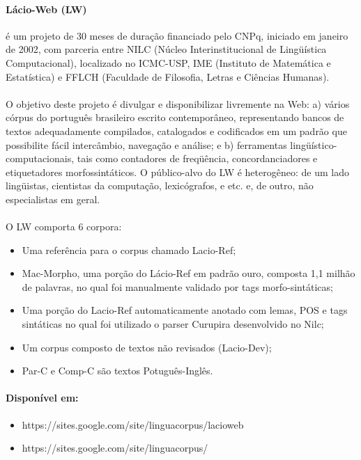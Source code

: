 \documentclass[a4paper, 10pt]{article}
\begin{document}
            	\paragraph{Lácio-Web (LW)} é um projeto de 30 meses de duração financiado pelo CNPq, iniciado em janeiro de 2002, com parceria entre NILC (Núcleo Interinstitucional de Lingüística Computacional), localizado no ICMC-USP, IME (Instituto de Matemática e Estatística) e FFLCH (Faculdade de Filosofia, Letras e Ciências Humanas).
                \paragraph{}O objetivo deste projeto é divulgar e disponibilizar livremente na Web: a) vários córpus do português brasileiro escrito contemporâneo, representando bancos de textos adequadamente compilados, catalogados e codificados em um padrão que possibilite fácil intercâmbio, navegação e análise; e b) ferramentas lingüístico-computacionais, tais como contadores de freqüência, concordanciadores e etiquetadores morfossintáticos. O público-alvo do LW é heterogêneo: de um lado lingüistas, cientistas da computação, lexicógrafos, e etc. e, de outro, não especialistas em geral.
                \paragraph{}O LW comporta 6 corpora:
                \begin{itemize}
                	\item Uma referência para o corpus chamado Lacio-Ref;
                    \item Mac-Morpho, uma porção do Lácio-Ref em padrão ouro, composta 1,1 milhão de palavras, no qual foi manualmente validado por tags morfo-sintáticas;
                    \item Uma porção do Lacio-Ref automaticamente anotado com lemas, POS e tags sintáticas no qual foi utilizado o parser Curupira desenvolvido no Nilc; 
                    \item Um corpus composto de textos não revisados (Lacio-Dev);
                    \item Par-C e Comp-C são textos Potuguês-Inglês.
                \end{itemize}
                \paragraph{Disponível em:}
            	\begin{itemize}
				    \item https://sites.google.com/site/linguacorpus/lacioweb
                    \item https://sites.google.com/site/linguacorpus/
			    \end{itemize}
\end{document}
